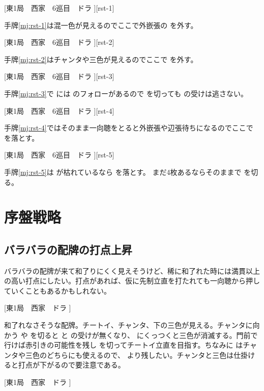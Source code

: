 \documentclass[10pt, twocolumn]{article}
\begin{document}
[東1局　西家　6巡目　ドラ ][rst-1]

手牌\ref{mj:rst-1}は混一色が見えるのでここで外嵌張の  を外す。

[東1局　西家　6巡目　ドラ ][rst-2]

手牌\ref{mj:rst-2}はチャンタや三色が見えるのでここで  を外す。

[東1局　西家　6巡目　ドラ ][rst-3]

手牌\ref{mj:rst-3}で  には  のフォローがあるので  を切っても  の受けは逃さない。

[東1局　西家　6巡目　ドラ ][rst-4]

手牌\ref{mj:rst-4}ではそのまま一向聴をとると外嵌張や辺張待ちになるのでここで  を落とす。

[東1局　西家　6巡目　ドラ ][rst-5]

手牌\ref{mj:rst-5}は  が枯れているなら  を落とす。 まだ4枚あるならそのままで  を切る。


\section{序盤戦略}

\subsection{バラバラの配牌の打点上昇}

バラバラの配牌が来て和了りにくく見えそうけど、稀に和了れた時には満貫以上の高い打点にしたい。打点があれば、仮に先制立直を打たれても一向聴から押していくこともあるかもしれない\citep[][pp. 40--47]{tetsusenryaku}。

[東1局　西家　ドラ ]

和了れなさそうな配牌。チートイ、チャンタ、下の三色が見える。チャンタに向かう  や  を切ると  と  の受けが無くなり、 にくっつくと三色が消滅する。門前で行けば赤引きの可能性を残し  を切ってチートイ立直を目指す。ちなみに  はチャンタや三色のどちらにも使えるので、 より残したい。チャンタと三色は仕掛けると打点が下がるので要注意である。

[東1局　西家　ドラ ]
\end{document}
